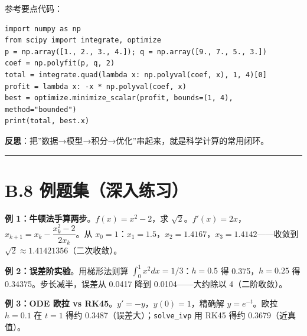 参考要点代码：

\begin{verbatim}
import numpy as np
from scipy import integrate, optimize
p = np.array([1., 2., 3., 4.]); q = np.array([9., 7., 5., 3.])
coef = np.polyfit(p, q, 2)
total = integrate.quad(lambda x: np.polyval(coef, x), 1, 4)[0]
profit = lambda x: -x * np.polyval(coef, x)
best = optimize.minimize_scalar(profit, bounds=(1, 4), method="bounded")
print(total, best.x)
\end{verbatim}

\textbf{反思}：把''数据→模型→积分→优化''串起来，就是科学计算的常用闭环。

\begin{center}\rule{0.5\linewidth}{0.5pt}\end{center}

\section{B.8
例题集（深入练习）}\label{b.8-ux4f8bux9898ux96c6ux6df1ux5165ux7ec3ux4e60}

\textbf{例 1：牛顿法手算两步}。\(f(x)=x^2-2\)，求
\(\sqrt2\)。\(f'(x)=2x\)，\(x_{k+1}=x_k-\dfrac{x_k^2-2}{2x_k}\)。从
\(x_0=1\)：\(x_1=1.5\)，\(x_2=1.4167\)，\(x_3=1.4142\)------收敛到
\(\sqrt2\approx1.41421356\)（二次收敛）。

\textbf{例 2：误差阶实验}。用梯形法则算
\(\int_0^1 x^2dx=1/3\)：\(h=0.5\) 得 0.375，\(h=0.25\) 得
0.34375。步长减半，误差从 0.0417 降到 0.0104------大约除以
4（二阶收敛）。

\begin{Shaded}
\begin{Highlighting}[]
\NormalTok{ [}\NormalTok{, }\NormalTok{]:}
\OperatorTok{=}\NormalTok{, } \OperatorTok{+}
\OperatorTok{=}\OperatorTok{**}
    \OperatorTok{{-}} \OperatorTok{/}\NormalTok{))}
\end{Highlighting}
\end{Shaded}

\textbf{例 3：ODE 欧拉 vs RK45}。\(y'=-y\)，\(y(0)=1\)，精确解
\(y=e^{-t}\)。欧拉 \(h=0.1\) 在 \(t=1\) 得约
0.3487（误差大）；\texttt{solve\_ivp} 用 RK45 得约 0.3679（近真值）。
